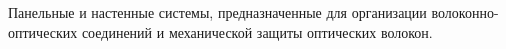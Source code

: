 Панельные и настенные системы, предназначенные для организации
волоконно-оптических соединений и механической защиты
оптических волокон.